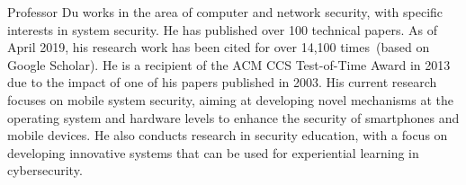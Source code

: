 Professor Du works in the area of computer and network security, with specific interests
in system security. He has published over 100 technical papers. As of April 2019, 
his research work has been cited for over 14,100 times~(based on Google Scholar). 
He is a recipient of the ACM CCS Test-of-Time Award in 2013 due to the impact of 
one of his papers published in 2003. His current research focuses on
mobile system security, aiming at 
developing novel mechanisms at the operating system and hardware levels
to enhance the security of smartphones and mobile devices. 
He also conducts research in
security education, with a focus on developing innovative 
systems that can be used for experiential learning
in cybersecurity. 
